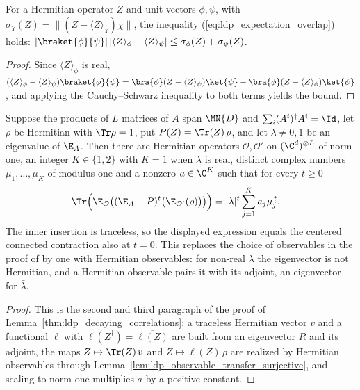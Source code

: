 \begin{lemma}
    \label{lem:ldp_expectation_overlap}
    \leanok
    For a Hermitian operator $Z$ and unit vectors $\phi,\psi$, with
    $\sigma_\chi(Z)=\lVert(Z-\langle Z\rangle_\chi)\chi\rVert$, the inequality
    (\ref{eq:ldp_expectation_overlap}) holds:
    $\lvert\braket{\phi}{\psi}\rvert\,
        \lvert\langle Z\rangle_\phi-\langle Z\rangle_\psi\rvert
        \le\sigma_\phi(Z)+\sigma_\psi(Z)$.
\end{lemma}
\begin{proof}
    \leanok
    Since $\langle Z\rangle_\phi$ is real,
    $(\langle Z\rangle_\phi-\langle Z\rangle_\psi)\braket{\phi}{\psi}
        =\bra{\phi}(Z-\langle Z\rangle_\psi)\ket{\psi}
        -\bra{\phi}(Z-\langle Z\rangle_\phi)\ket{\psi}$, and applying the
    Cauchy--Schwarz inequality to both terms yields the bound.
\end{proof}

\begin{lemma}
    \label{lem:ldp_hermitian_observables}
    \leanok
    Suppose the products of $L$ matrices of $A$ span $\MN{D}$ and
    $\sum_i(A^i)^\dagger A^i=\Id$, let $\rho$ be Hermitian with $\Tr\rho=1$,
    put $P(Z)=\Tr(Z)\,\rho$, and let $\lambda\neq0,1$ be an eigenvalue of
    $\E_A$. Then there are Hermitian operators $\mathcal O,\mathcal O'$ on
    $(\C^d)^{\otimes L}$ of norm one, an integer $K\in\{1,2\}$ with $K=1$ when
    $\lambda$ is real, distinct complex numbers $\mu_1,\dots,\mu_K$ of modulus
    one and a nonzero $a\in\C^K$ such that for every $t\ge0$
    \begin{align}
        \Tr\Bigl(\E_{\mathcal O}\bigl((\E_A-P)^t
        \bigl(\E_{\mathcal O'}(\rho)\bigr)\bigr)\Bigr)
         & =\lvert\lambda\rvert^t\sum_{j=1}^Ka_j\mu_j^{\,t}.
        \notag
    \end{align}
    The inner insertion is traceless, so the displayed expression equals the
    centered connected contraction also at $t=0$. This replaces the choice
    of observables in the proof of \cite[Lemma~2]{Malz2024Preparation}
    by one with Hermitian observables: for
    non-real $\lambda$ the eigenvector is not Hermitian, and a Hermitian
    observable pairs it with its adjoint, an eigenvector for $\bar\lambda$.
\end{lemma}
\begin{proof}
    \leanok
    This is the second and third paragraph of the proof of
    Lemma~\ref{thm:ldp_decaying_correlations}: a traceless Hermitian vector $v$ and a
    functional $\ell$ with $\ell(Z^\dagger)=\overline{\ell(Z)}$ are built from
    an eigenvector $R$ and its adjoint, the maps $Z\mapsto\Tr(Z)\,v$ and
    $Z\mapsto\ell(Z)\,\rho$ are realized by Hermitian observables through
    Lemma~\ref{lem:ldp_observable_transfer_surjective}, and scaling to norm one
    multiplies $a$ by a positive constant.
\end{proof}

